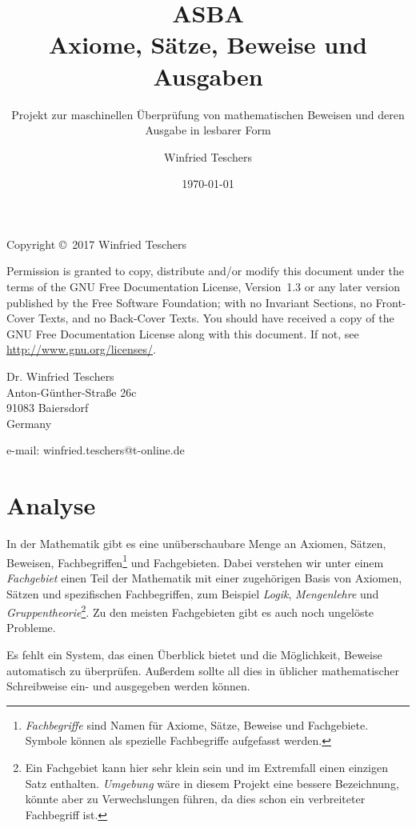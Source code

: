 \documentclass[english,ngerman,parskip=half,headsepline,footsepline]{scrreprt}
\title{ASBA\\Axiome, Sätze, Beweise und Ausgaben}
\subtitle{Projekt zur maschinellen Überprüfung von mathematischen Beweisen und deren Ausgabe in lesbarer Form}
\author{Winfried Teschers}
\date{\today}
\begin{document}
	
	\maketitle
	
	\tableofcontents
	\thispagestyle{scrheadings}
	
	\vfill
	Copyright \copyright\ 2017 Winfried Teschers
	
	\bigskip
	Permission is granted to copy, distribute and/or modify this document under the terms of the GNU Free Documentation License, Version~1.3 or any later version published by the Free Software Foundation; with no Invariant Sections, no Front-Cover Texts, and no Back-Cover Texts. You should have received a copy of the GNU Free Documentation License along with this document.  If not, see \url{http://www.gnu.org/licenses/}.
	\bigskip
	
	Dr. Winfried Teschers\\
	Anton-Günther-Straße 26c\\
	91083 Baiersdorf\\
	Germany
	
	e-mail: winfried.teschers@t-online.de
		
	
	\chapter{Analyse}
	\ihead{\textsf{\textbf{\chaptername\ \thesection}}}
	\thispagestyle{scrheadings}
	
	In der Mathematik gibt es eine unüberschaubare Menge an Axiomen, Sätzen, Beweisen, Fachbegriffen\footnote{ \emph{Fachbegriffe} sind Namen für Axiome, Sätze, Beweise und Fachgebiete. Symbole können als spezielle Fachbegriffe aufgefasst werden.} und Fachgebieten. Dabei verstehen wir unter einem \emph{Fachgebiet} einen Teil der Mathematik  mit einer zugehörigen Basis von Axiomen, Sätzen und spezifischen Fachbegriffen, zum Beispiel \emph{Logik}, \emph{Mengenlehre} und \emph{Gruppentheorie}\footnote{ Ein Fachgebiet kann hier sehr klein sein und im Extremfall einen einzigen Satz enthalten. \emph{Umgebung} wäre in diesem Projekt eine bessere Bezeichnung, könnte aber zu Verwechslungen führen, da dies schon ein verbreiteter Fachbegriff ist.}. Zu den meisten Fachgebieten gibt es auch noch ungelöste Probleme.
	
	Es fehlt ein System, das einen Überblick bietet und die Möglichkeit, Beweise automatisch zu überprüfen. Außerdem sollte all dies in üblicher mathematischer Schreibweise ein- und ausgegeben werden können.
	
\end{document}
